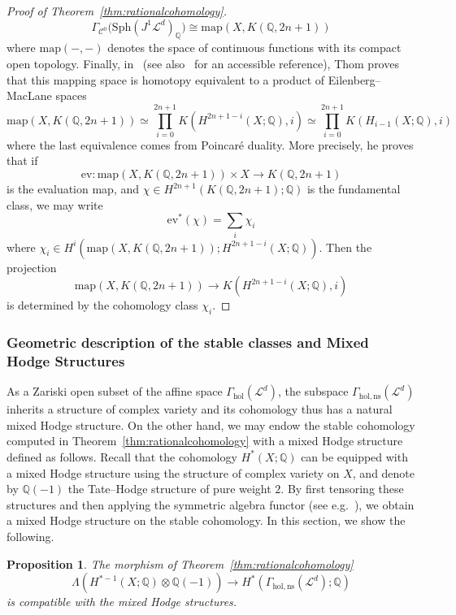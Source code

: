 \documentclass[a4paper]{amsart}
\newcommand{\bQ}{\mathbb Q}
\newcommand{\cC}{\mathcal C}
\newcommand{\cL}{\mathcal L}
\newcommand{\lra}{\longrightarrow}
\newcommand\map{\mathrm{map}}
\newcommand{\Sph}{\mathrm{Sph}}
\theoremstyle{plain}
\newtheorem{proposition}[theorem]{Proposition}
\theoremstyle{definition}
\newcommand{\Gammahol}{\Gamma_{\mathrm{hol}}}
\begin{document}
\begin{proof}[Proof of Theorem~\ref{thm:rationalcohomology}]
\[
    \Gamma_{\cC^0}\Big(\Sph\left(J^1\cL^d\right)_\bQ\Big) \cong \map(X, K(\bQ,2n+1))
\]
where $\map(-,-)$ denotes the space of continuous functions with its compact open topology. Finally, in~\cite{thom_homologie_1956} (see also~\cite{haefliger_rational_1982} for an accessible reference), Thom proves that this mapping space is homotopy equivalent to a product of Eilenberg--MacLane spaces
\[
    \map(X, K(\bQ,2n+1)) \simeq \prod_{i=0}^{2n +1} K\left(H^{2n+1-i}(X;\bQ), i\right) \simeq \prod_{i=0}^{2n +1} K\left(H_{i-1}(X;\bQ), i\right)
\]
where the last equivalence comes from Poincaré duality. More precisely, he proves that if
\[
    \mathrm{ev} \colon \map(X,K(\bQ,2n+1)) \times X \lra K(\bQ,2n+1)
\]
is the evaluation map, and $\chi \in H^{2n+1}(K(\bQ,2n+1); \bQ)$ is the fundamental class, we may write
\[
    \mathrm{ev}^*(\chi) = \sum_i \chi_i
\]
where $\chi_i \in H^i(\map(X,K(\bQ,2n+1)); H^{2n+1-i}(X;\bQ))$. Then the projection 
\[
    \map(X,K(\bQ,2n+1)) \to K(H^{2n+1-i}(X;\bQ),i)
\]
is determined by the cohomology class $\chi_i$.
\end{proof}

\subsubsection{Geometric description of the stable classes and Mixed Hodge Structures}

As a Zariski open subset of the affine space $\Gammahol(\cL^d)$, the subspace $\Gamma_{\mathrm{hol,ns}}(\cL^d)$ inherits a structure of complex variety and its cohomology thus has a natural mixed Hodge structure. On the other hand, we may endow the stable cohomology computed in Theorem~\ref{thm:rationalcohomology} with a mixed Hodge structure defined as follows. Recall that the cohomology $H^*(X; \bQ)$ can be equipped with a mixed Hodge structure using the structure of complex variety on $X$, and denote by $\bQ(-1)$ the Tate--Hodge structure of pure weight $2$. By first tensoring these structures and then applying the symmetric algebra functor (see e.g.~\cite[Section 3.1]{peters_mixed_2008}), we obtain a mixed Hodge structure on the stable cohomology. In this section, we show the following.
\begin{proposition}
The morphism of Theorem~\ref{thm:rationalcohomology}
\[
    \Lambda\left(H^{*-1}(X;\bQ) \otimes \bQ(-1) \right) \lra H^*(\Gamma_{\mathrm{hol,ns}}(\cL^d); \bQ)
\]
is compatible with the mixed Hodge structures.
\end{proposition}
\end{document}
